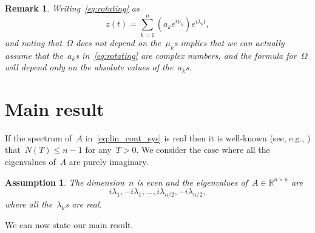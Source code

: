 \documentclass[final ]{IEEEtran}
\newcommand{\Spec}{\operatorname{Spec}}
\newtheorem{assumption}{Assumption}
\newtheorem{remark}{Remark}
\newcommand {\R}{\mathbb R}
\begin{document}
\begin{remark}
Writing~\eqref{eq:rotating}  as
\[
z(t)   =\sum_{k=1}^n (a_k e^{i \mu_k} ) e^{i \lambda_k t  } ,
\]
and noting that~$\Omega$ does not depend on the~$\mu_k$s 
implies that we can actually assume that
the~$a_k$s in~\eqref{eq:rotating}  
are complex numbers,
and the formula for~$\Omega$ will depend
only on  the absolute values of the~$a_k$s. 
\end{remark}
\section{Main result}\label{sec:density}

If the spectrum of~$A $ in~\eqref{eq:lin_cont_sys} is real then it is well-known (see, e.g., \cite[Theorem~6-8]{athans_falb})  that~$N(T)\leq n-1$ for any~$T > 0$. We consider the    case where  all the eigenvalues of~$A$ are purely imaginary. 
 
\begin{assumption}\label{assump:dominanat}
The dimension~$n$ is even and the 
eigenvalues of~$A\in\R^{n\times n}$ are 
\[
i\lambda_1, -i\lambda_1 ,\dots, i\lambda_{n/2}, -i\lambda_{n/2}, 
\]
where all the~$\lambda_k$s are real. 
\end{assumption}

We can now state our main result. 
\end{document}
